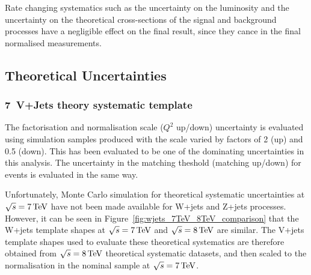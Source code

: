 Rate changing systematics such as the uncertainty on the luminosity and the uncertainty on the theoretical
cross-sections of the signal and background processes have a negligible effect on the final result, since they
cance in the final normalised measurements.

\subsection{Theoretical Uncertainties}
\label{ss:theoretical_uncertainties}

\subsubsection{7~\TeV V+Jets theory systematic template}
\label{sss:7TeV_vjets_theory_systematic_template}

The factorisation and normalisation scale ($Q^{2}$ up/down) uncertainty is evaluated using simulation samples
produced with the scale varied by factors of 2 (up) and 0.5 (down). This has been evaluated to be one of the
dominating uncertainties in this analysis. The uncertainty in the matching theshold (matching up/down) for
\ttbar events is evaluated in the same way.

Unfortunately, Monte Carlo simulation for theoretical systematic uncertainties at $\sqrt{s}=7\,\text{Te\hspace{-.08em}V}$ have not
been made available for W+jets and Z+jets processes. However, it can be seen in
Figure~\ref{fig:wjets_7TeV_8TeV_comparison} that the W+jets template shapes at $\sqrt{s}=7\,\text{Te\hspace{-.08em}V}$ and
$\sqrt{s}=8\,\text{Te\hspace{-.08em}V}$ are similar. The V+jets template shapes used to evaluate these theoretical systematics are
therefore obtained from $\sqrt{s}=8\,\text{Te\hspace{-.08em}V}$ theoretical systematic datasets, and then scaled to the normalisation
in the nominal sample at $\sqrt{s}=7\,\text{Te\hspace{-.08em}V}$.

